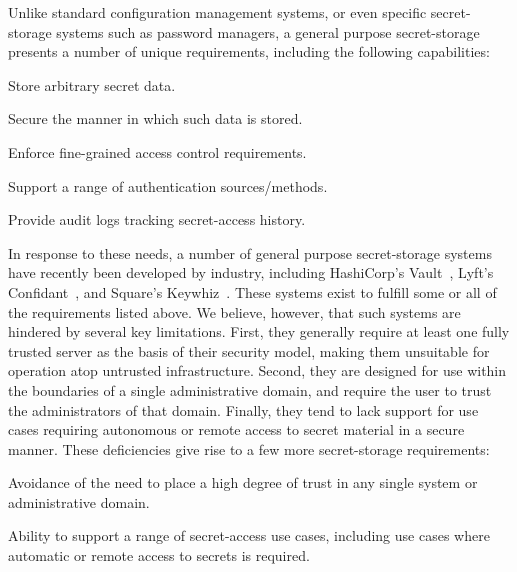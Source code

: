 Unlike standard configuration management systems, or even specific
secret-storage systems such as password managers, a general purpose
secret-storage presents a number of unique requirements, including the
following capabilities:

\begin{packed_item}
\item Store arbitrary secret data.
\item Secure the manner in which such data is stored.
\item Enforce fine-grained access control requirements.
\item Support a range of authentication sources/methods.
\item Provide audit logs tracking secret-access history.
\end{packed_item}

In response to these needs, a number of general purpose secret-storage
systems have recently been developed by industry, including
HashiCorp's Vault~\cite{vault}, Lyft's Confidant~\cite{confidant}, and
Square's Keywhiz~\cite{keywhiz}. These systems exist to fulfill some
or all of the requirements listed above. We believe, however, that
such systems are hindered by several key limitations. First, they
generally require at least one fully trusted server as the basis of
their security model, making them unsuitable for operation atop
untrusted infrastructure. Second, they are designed for use within the
boundaries of a single administrative domain, and require the user to
trust the administrators of that domain. Finally, they tend to lack
support for use cases requiring autonomous or remote access to secret
material in a secure manner. These deficiencies give rise to a few
more secret-storage requirements:

\begin{packed_item}
\item Avoidance of the need to place a high degree of trust in any
  single system or administrative domain.
\item Ability to support a range of secret-access use cases, including
  use cases where automatic or remote access to secrets is required.
\end{packed_item}

